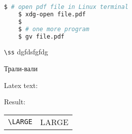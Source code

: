 



\begin{lstlisting}[language=bash]
    $ # open pdf file in Linux terminal
    $ xdg-open file.pdf
    $
    $ # one more program
    $ gv file.pdf

\end{lstlisting}

\noindent
\verb*|\ss|  dgfdsfgfdg

Трали-вали

Latex text:


Result:


\begin{table*}[h]
    \begin{tabular}{ll}

        \verb*|\LARGE| & \LARGE LARGE \\
    \end{tabular}
\end{table*}

\begin{minipage}{0.1\textwidth}
    \begin{flushleft}
        
    \end{flushleft}
\end{minipage}

\begin{minipage}{0.1\textwidth}
    \begin{flushleft}
        
    \end{flushleft}
\end{minipage}


